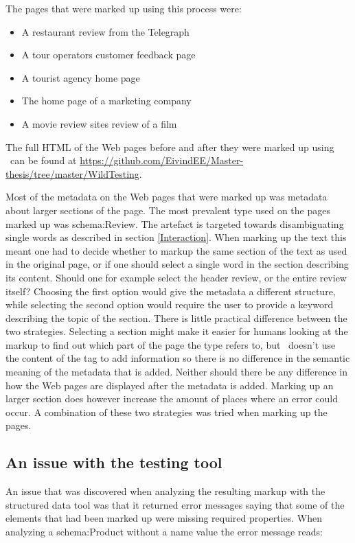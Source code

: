 The pages that were marked up using this process were:
\begin{itemize}
	\item A restaurant review from the Telegraph
	\item A tour operators customer feedback page
	\item A tourist agency home page
	\item The home page of a marketing company
	\item A movie review sites review of a film
\end{itemize}

The full HTML of the Web pages before and after they were marked up using \theartefact\ can be found at
\url{https://github.com/EivindEE/Master-thesis/tree/master/WildTesting}.

Most of the metadata on the Web pages that were marked up was metadata about larger sections of the page.
The most prevalent type used on the pages marked up was schema:Review.
The artefact is targeted towards disambiguating single words as described in section \ref{Interaction}.
When marking up the text this meant one had to decide whether to markup the same section of the text as used in the original page,
or if one should select a single word in the section describing its content.
Should one for example select the header review, or the entire review itself?
Choosing the first option would give the metadata a different structure,
while selecting the second option would require the user to provide a keyword describing the topic of the section.
There is little practical difference between the two strategies.
Selecting a section might make it easier for humans looking at the markup to find out which part of the page the type refers to,
but \theartefact\ doesn't use the content of the tag to add information so there is no difference in the semantic meaning of the metadata that is added.
Neither should there be any difference in how the Web pages are displayed after the metadata is added.
Marking up an larger section does however increase the amount of places where an error could occur.
A combination of these two strategies was tried when marking up the pages.

\subsection{An issue with the testing tool}
An issue that was discovered when analyzing the resulting markup with the structured data tool was that
it returned  error messages saying that some of the elements that had been marked up were missing required properties.
When analyzing a schema:Product without a name value the error message reads:

